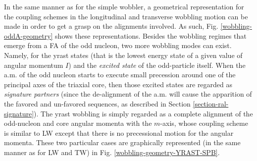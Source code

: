 In the same manner as for the simple wobbler, a geometrical representation for the coupling schemes in the longitudinal and transverse wobbling motion can be made in order to get a grasp on the alignments involved. As such, Fig. \ref{wobbling-oddA-geometry} shows these representations. Besides the wobbling regimes that emerge from a FA of the odd nucleon, two more wobbling modes can exist. Namely, for the yrast states (that is the lowest energy state of a given value of angular momentum $I$) and the \emph{excited state} of the odd-particle itself. When the a.m. of the odd nucleon starts to execute small precession around one of the principal axes of the triaxial core, then those excited states are regarded as \emph{signature partners} (since the de-alignment of the a.m. will cause the apparition of the favored and un-favored sequences, as described in Section \ref{section-ral-signature}). The yrast wobbling is simply regarded as a complete alignment of the odd-nucleon and core angular momenta with the $m$-axis, whose coupling scheme is similar to LW except that there is no precessional motion for the angular momenta. These two particular cases are graphically represented (in the same manner as for LW and TW) in Fig. \ref{wobbling-geometry-YRAST-SPB}.
